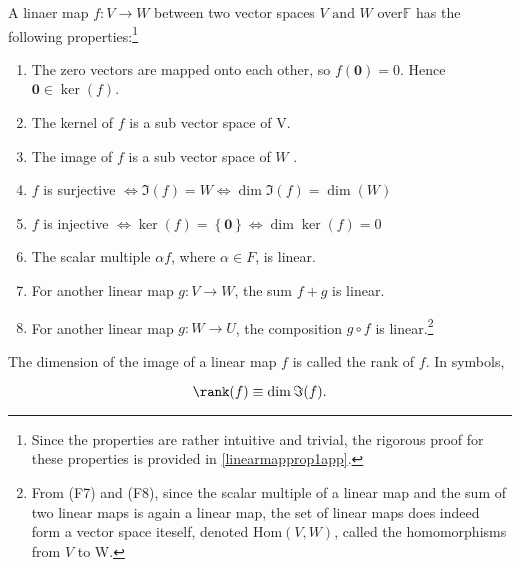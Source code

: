 \documentclass[a4paper,12pt]{report}
\begin{document}
\begin{lemma} \label{linearmapprop1} 
A linaer map \(f:V \rightarrow W\) between two vector spaces \(V \text { and }  W\) over\(\mathbb{F}\) has the following properties:\footnote{Since the properties are rather intuitive and trivial, the rigorous proof for these properties is provided in \cref{linearmapprop1app}.} 

\begin{enumerate}[label=(\(F\)\arabic*)]
    \item The zero vectors are mapped onto each other, so \(f(\boldsymbol{0} ) = 0\). Hence \(\boldsymbol{0} \in \ker (f) \).
    \item The kernel of \(f\) is a sub vector space of V.
    \item The image of \(f\) is a sub vector space of \(W\) .
    \item \(f\) is surjective \(\iff \Im (f) = W \iff \dim \Im (f) = \dim (W)\)
    \item \(f\) is injective \(\iff \ker (f) = \left\{ \boldsymbol{0}  \right\} \iff \dim \ker (f) = 0\)
    \item The scalar multiple \(\alpha f\), where \(\alpha \in  F\), is linear.
    \item For another linear map \(g: V \rightarrow W\), the sum \(f+g\) is linear.
    \item For another linear map \(g: W \rightarrow  U\), the composition \(g \circ f\) is linear.\footnote{From (F7) and (F8), since the scalar multiple of a linear map and the sum of two linear maps is again a linear map, the set of linear maps does indeed form a vector space iteself, denoted \(\text{Hom}(V,W)\), called the homomorphisms from \(V\) to W.}
\end{enumerate}
\end{lemma}

\begin{definition} 
The dimension of the image of a linear map \(f\) is called the rank of \(f\). In symbols,

\begin{equation}
    \rank (f) \equiv \dim \Im (f).
\end{equation}
    
\end{definition}
\end{document}
